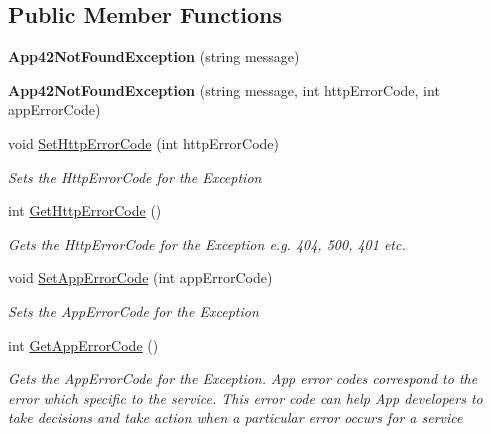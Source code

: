 \subsection*{Public Member Functions}
\begin{DoxyCompactItemize}
\item 
\hypertarget{classcom_1_1shephertz_1_1app42_1_1paas_1_1sdk_1_1csharp_1_1_app42_not_found_exception_a41be6b94d63400f5be1993192179fb7b}{{\bfseries App42\+Not\+Found\+Exception} (string message)}\label{classcom_1_1shephertz_1_1app42_1_1paas_1_1sdk_1_1csharp_1_1_app42_not_found_exception_a41be6b94d63400f5be1993192179fb7b}

\item 
\hypertarget{classcom_1_1shephertz_1_1app42_1_1paas_1_1sdk_1_1csharp_1_1_app42_not_found_exception_a0c3d3c2da543b68ce3bece697b8b249e}{{\bfseries App42\+Not\+Found\+Exception} (string message, int http\+Error\+Code, int app\+Error\+Code)}\label{classcom_1_1shephertz_1_1app42_1_1paas_1_1sdk_1_1csharp_1_1_app42_not_found_exception_a0c3d3c2da543b68ce3bece697b8b249e}

\item 
void \hyperlink{classcom_1_1shephertz_1_1app42_1_1paas_1_1sdk_1_1csharp_1_1_app42_not_found_exception_acb9a798814889b2a42d772cf1eca09db}{Set\+Http\+Error\+Code} (int http\+Error\+Code)
\begin{DoxyCompactList}\small\item\em Sets the Http\+Error\+Code for the Exception \end{DoxyCompactList}\item 
int \hyperlink{classcom_1_1shephertz_1_1app42_1_1paas_1_1sdk_1_1csharp_1_1_app42_not_found_exception_ac5bf1f276a180e520e44efe30d49fe4e}{Get\+Http\+Error\+Code} ()
\begin{DoxyCompactList}\small\item\em Gets the Http\+Error\+Code for the Exception e.\+g. 404, 500, 401 etc. \end{DoxyCompactList}\item 
void \hyperlink{classcom_1_1shephertz_1_1app42_1_1paas_1_1sdk_1_1csharp_1_1_app42_not_found_exception_aa888779448e38189ecfbbfc613613f1b}{Set\+App\+Error\+Code} (int app\+Error\+Code)
\begin{DoxyCompactList}\small\item\em Sets the App\+Error\+Code for the Exception \end{DoxyCompactList}\item 
int \hyperlink{classcom_1_1shephertz_1_1app42_1_1paas_1_1sdk_1_1csharp_1_1_app42_not_found_exception_a8e0649ed1959915b112f5138011f8523}{Get\+App\+Error\+Code} ()
\begin{DoxyCompactList}\small\item\em Gets the App\+Error\+Code for the Exception. App error codes correspond to the error which specific to the service. This error code can help App developers to take decisions and take action when a particular error occurs for a service \end{DoxyCompactList}\end{DoxyCompactItemize}


